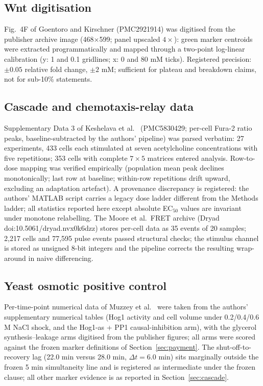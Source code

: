 \documentclass[11pt,a4paper]{article}
\begin{document}
\subsection{Wnt digitisation}

Fig.\ 4F of Goentoro and Kirschner \cite{Goentoro2009Wnt} (PMC2921914) was digitised from the publisher archive image (468$\times$599; panel upscaled $4\times$): green marker centroids were extracted programmatically and mapped through a two-point log-linear calibration (y: 1 and 0.1 gridlines; x: 0 and 80 mM ticks). Registered precision: $\pm0.05$ relative fold change, $\pm2$ mM; sufficient for plateau and breakdown claims, not for sub-10\% statements.

\subsection{Cascade and chemotaxis-relay data}

Supplementary Data 3 of Keshelava et al.\ \cite{Keshelava2018} (PMC5830429; per-cell Fura-2 ratio peaks, baseline-subtracted by the authors' pipeline) was parsed verbatim: 27 experiments, 433 cells each stimulated at seven acetylcholine concentrations with five repetitions; 353 cells with complete $7\times5$ matrices entered analysis. Row-to-dose mapping was verified empirically (population mean peak declines monotonically; last row at baseline; within-row repetitions drift upward, excluding an adaptation artefact). A provenance discrepancy is registered: the authors' MATLAB script carries a legacy dose ladder different from the Methods ladder; all statistics reported here except absolute EC$_{50}$ values are invariant under monotone relabelling. The Moore et al.\ FRET archive \cite{Moore2024} (Dryad doi:10.5061/dryad.nvx0k6dzz) stores per-cell data as 35 events of 20 samples; 2,217 cells and 77,595 pulse events passed structural checks; the stimulus channel is stored as unsigned 8-bit integers and the pipeline corrects the resulting wrap-around in naive differencing.

\subsection{Yeast osmotic positive control}

Per-time-point numerical data of Muzzey et al.\ \cite{Muzzey2009} were taken from the authors' supplementary numerical tables (Hog1 activity and cell volume under 0.2/0.4/0.6 M NaCl shock, and the Hog1-as + PP1 causal-inhibition arm), with the glycerol synthesis--leakage arms digitised from the publisher figures; all arms were scored against the frozen marker definitions of Section~\ref{sec:payment}. The shut-off-to-recovery lag (22.0 min versus 28.0 min, $\Delta t=6.0$ min) sits marginally outside the frozen 5 min simultaneity line and is registered as intermediate under the frozen clause; all other marker evidence is as reported in Section~\ref{sec:cascade}.
\end{document}
